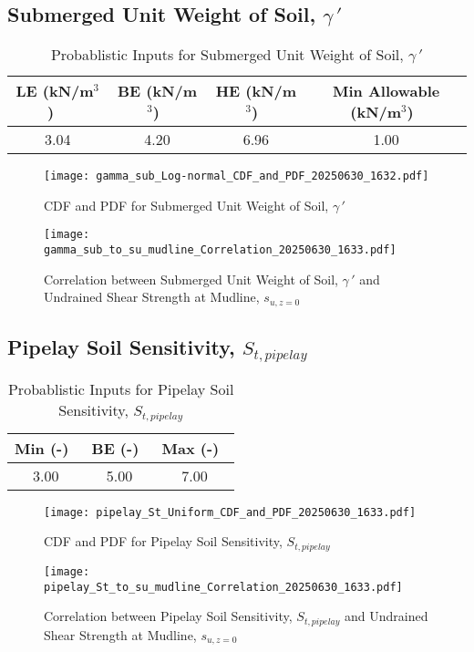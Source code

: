 \documentclass{article}
\begin{document}
\subsection*{Submerged Unit Weight of Soil, $\gamma\,'$}
\begin{table}[h!]
\centering
\caption{Probablistic Inputs for Submerged Unit Weight of Soil, $\gamma\,'$}
\begin{tabular}{|c|c|c|c|}
\hline
LE (kN/m$^3$) \ & BE (kN/m$^3$)\ & HE (kN/m$^3$)\ & Min Allowable (kN/m$^3$)\ \\
\hline
3.04 & 4.20 & 6.96 & 1.00 \\
\hline
\end{tabular}
\end{table}
\begin{figure}[h!]
\centering
\texttt{[image: gamma\_sub\_Log-normal\_CDF\_and\_PDF\_20250630\_1632.pdf]}
\caption{CDF and PDF for Submerged Unit Weight of Soil, $\gamma\,'$}
\end{figure}
\begin{figure}[h!]
\centering
\texttt{[image: gamma\_sub\_to\_su\_mudline\_Correlation\_20250630\_1633.pdf]}
\caption{Correlation between Submerged Unit Weight of Soil, $\gamma\,'$ and Undrained Shear Strength at Mudline, $s_{{u,z=0}}$}
\end{figure}
\clearpage
\subsection*{Pipelay Soil Sensitivity, $S_{{t,pipelay}}$}
\begin{table}[h!]
\centering
\caption{Probablistic Inputs for Pipelay Soil Sensitivity, $S_{{t,pipelay}}$}
\begin{tabular}{|c|c|c|}
\hline
Min (-)\ & BE (-)\ & Max (-)\ \\
\hline
3.00 & 5.00 & 7.00 \\
\hline
\end{tabular}
\end{table}
\begin{figure}[h!]
\centering
\texttt{[image: pipelay\_St\_Uniform\_CDF\_and\_PDF\_20250630\_1633.pdf]}
\caption{CDF and PDF for Pipelay Soil Sensitivity, $S_{{t,pipelay}}$}
\end{figure}
\begin{figure}[h!]
\centering
\texttt{[image: pipelay\_St\_to\_su\_mudline\_Correlation\_20250630\_1633.pdf]}
\caption{Correlation between Pipelay Soil Sensitivity, $S_{{t,pipelay}}$ and Undrained Shear Strength at Mudline, $s_{{u,z=0}}$}
\end{figure}
\clearpage
\end{document}
